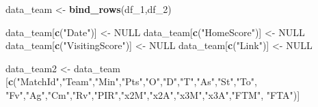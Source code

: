\documentclass[
]{article}
\newenvironment{Shaded}{\begin{snugshade}}{\end{snugshade}}
\newcommand{\DecValTok}[1]{\textcolor[rgb]{0.00,0.00,0.81}{#1}}
\newcommand{\KeywordTok}[1]{\textcolor[rgb]{0.13,0.29,0.53}{\textbf{#1}}}
\newcommand{\NormalTok}[1]{#1}
\newcommand{\OtherTok}[1]{\textcolor[rgb]{0.56,0.35,0.01}{#1}}
\newcommand{\StringTok}[1]{\textcolor[rgb]{0.31,0.60,0.02}{#1}}
\begin{document}
\begin{Shaded}
\begin{Highlighting}[]
\NormalTok{data_team <-}\StringTok{ }\KeywordTok{bind_rows}\NormalTok{(df_}\DecValTok{1}\NormalTok{,df_}\DecValTok{2}\NormalTok{)}

\NormalTok{data_team[}\KeywordTok{c}\NormalTok{(}\StringTok{"Date"}\NormalTok{)] <-}\StringTok{ }\OtherTok{NULL}
\NormalTok{data_team[}\KeywordTok{c}\NormalTok{(}\StringTok{"HomeScore"}\NormalTok{)] <-}\StringTok{ }\OtherTok{NULL}
\NormalTok{data_team[}\KeywordTok{c}\NormalTok{(}\StringTok{"VisitingScore"}\NormalTok{)] <-}\StringTok{ }\OtherTok{NULL}
\NormalTok{data_team[}\KeywordTok{c}\NormalTok{(}\StringTok{"Link"}\NormalTok{)] <-}\StringTok{ }\OtherTok{NULL}

\NormalTok{data_team2 <-}\StringTok{ }\NormalTok{data_team [}\KeywordTok{c}\NormalTok{(}\StringTok{"MatchId"}\NormalTok{,}\StringTok{"Team"}\NormalTok{,}\StringTok{"Min"}\NormalTok{,}\StringTok{"Pts"}\NormalTok{,}\StringTok{"O"}\NormalTok{,}\StringTok{"D"}\NormalTok{,}\StringTok{"T"}\NormalTok{,}\StringTok{"As"}\NormalTok{,}\StringTok{"St"}\NormalTok{,}\StringTok{"To"}\NormalTok{,}
                           \StringTok{"Fv"}\NormalTok{,}\StringTok{"Ag"}\NormalTok{,}\StringTok{"Cm"}\NormalTok{,}\StringTok{"Rv"}\NormalTok{,}\StringTok{"PIR"}\NormalTok{,}\StringTok{"x2M"}\NormalTok{,}\StringTok{"x2A"}\NormalTok{,}\StringTok{"x3M"}\NormalTok{,}\StringTok{"x3A"}\NormalTok{,}\StringTok{"FTM"}\NormalTok{,}
                           \StringTok{"FTA"}\NormalTok{)]}


\end{Highlighting}
\end{Shaded}
\end{document}
